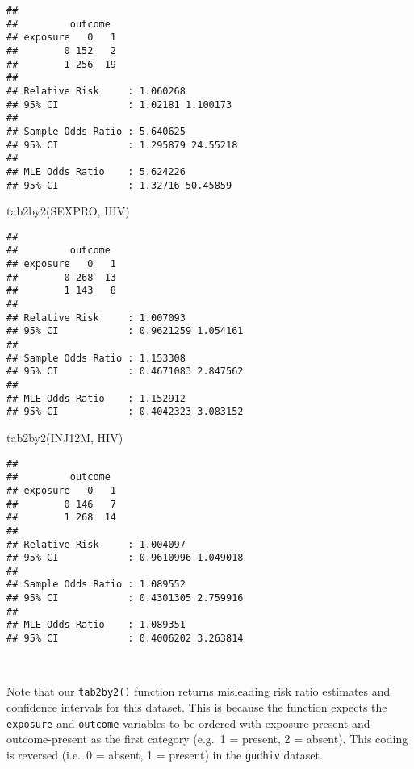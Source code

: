 \documentclass[
  12pt,
  a4paper]{book}
\newenvironment{Shaded}{\begin{snugshade}}{\end{snugshade}}
\newcommand{\FunctionTok}[1]{\textcolor[rgb]{0.00,0.00,0.00}{#1}}
\newcommand{\NormalTok}[1]{#1}
\begin{document}
\begin{verbatim}
## 
##         outcome
## exposure   0   1
##        0 152   2
##        1 256  19
## 
## Relative Risk     : 1.060268 
## 95% CI            : 1.02181 1.100173 
## 
## Sample Odds Ratio : 5.640625 
## 95% CI            : 1.295879 24.55218 
## 
## MLE Odds Ratio    : 5.624226 
## 95% CI            : 1.32716 50.45859
\end{verbatim}

\newpage

\begin{Shaded}
\begin{Highlighting}[]
\FunctionTok{tab2by2}\NormalTok{(SEXPRO, HIV)}
\end{Highlighting}
\end{Shaded}

\begin{verbatim}
## 
##         outcome
## exposure   0   1
##        0 268  13
##        1 143   8
## 
## Relative Risk     : 1.007093 
## 95% CI            : 0.9621259 1.054161 
## 
## Sample Odds Ratio : 1.153308 
## 95% CI            : 0.4671083 2.847562 
## 
## MLE Odds Ratio    : 1.152912 
## 95% CI            : 0.4042323 3.083152
\end{verbatim}

\begin{Shaded}
\begin{Highlighting}[]
\FunctionTok{tab2by2}\NormalTok{(INJ12M, HIV)}
\end{Highlighting}
\end{Shaded}

\begin{verbatim}
## 
##         outcome
## exposure   0   1
##        0 146   7
##        1 268  14
## 
## Relative Risk     : 1.004097 
## 95% CI            : 0.9610996 1.049018 
## 
## Sample Odds Ratio : 1.089552 
## 95% CI            : 0.4301305 2.759916 
## 
## MLE Odds Ratio    : 1.089351 
## 95% CI            : 0.4006202 3.263814
\end{verbatim}

~

Note that our \texttt{tab2by2()} function returns misleading risk ratio estimates and confidence intervals for this dataset. This is because the function expects the \texttt{exposure} and \texttt{outcome} variables to be ordered with exposure-present and outcome-present as the first category (e.g.~1 = present, 2 = absent). This coding is reversed (i.e.~0 = absent, 1 = present) in the \texttt{gudhiv} dataset.
\end{document}
